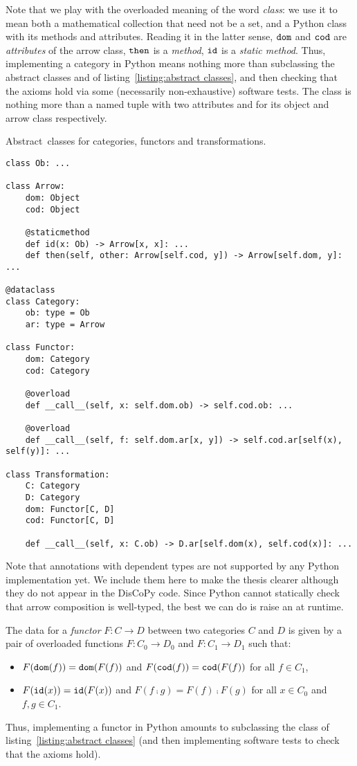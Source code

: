 Note that we play with the overloaded meaning of the word \emph{class}: we use it to mean both a mathematical collection that need not be a set, and a Python class with its methods and attributes.
Reading it in the latter sense, $\mathtt{dom}$ and $\mathtt{cod}$ are \emph{attributes} of the arrow class, $\mathtt{then}$ is a \emph{method}, $\mathtt{id}$ is a \emph{static method}.
Thus, implementing a category in Python means nothing more than subclassing the abstract classes  and  of listing~\ref{listing:abstract classes}, and then checking that the axioms hold via some (necessarily non-exhaustive) software tests.
The  class is nothing more than a named tuple with two attributes  and  for its object and arrow class respectively.

\begin{python}\label{listing:abstract classes}
{\normalfont Abstract classes for categories, functors and transformations.}

\begin{verbatim}
class Ob: ...

class Arrow:
    dom: Object
    cod: Object

    @staticmethod
    def id(x: Ob) -> Arrow[x, x]: ...
    def then(self, other: Arrow[self.cod, y]) -> Arrow[self.dom, y]: ...

@dataclass
class Category:
    ob: type = Ob
    ar: type = Arrow

class Functor:
    dom: Category
    cod: Category

    @overload
    def __call__(self, x: self.dom.ob) -> self.cod.ob: ...

    @overload
    def __call__(self, f: self.dom.ar[x, y]) -> self.cod.ar[self(x), self(y)]: ...

class Transformation:
    C: Category
    D: Category
    dom: Functor[C, D]
    cod: Functor[C, D]

    def __call__(self, x: C.ob) -> D.ar[self.dom(x), self.cod(x)]: ...
\end{verbatim}

Note that annotations with dependent types are not supported by any Python implementation yet.
We include them here to make the thesis clearer although they do not appear in the DisCoPy code.
Since Python cannot statically check that arrow composition is well-typed, the best we can do is raise an  at runtime.
\end{python}

The data for a \emph{functor} $F : C \to D$ between two categories $C$ and $D$ is given by a pair of overloaded functions $F : C_0 \to D_0$ and $F : C_1 \to D_1$ such that:
\begin{itemize}
    \item $F(\mathtt{dom}(f)) = \mathtt{dom}(F(f))$ and $F(\mathtt{cod}(f)) = \mathtt{cod}(F(f))$ for all $f \in C_1$,
    \item $F(\mathtt{id}(x)) = \mathtt{id}(F(x))$ and $F(f \fcmp g) = F(f) \fcmp F(g)$ for all $x \in C_0$ and $f, g \in C_1$.
\end{itemize}
Thus, implementing a functor in Python amounts to subclassing the  class of listing~\ref{listing:abstract classes} (and then implementing software tests to check that the axioms hold).

